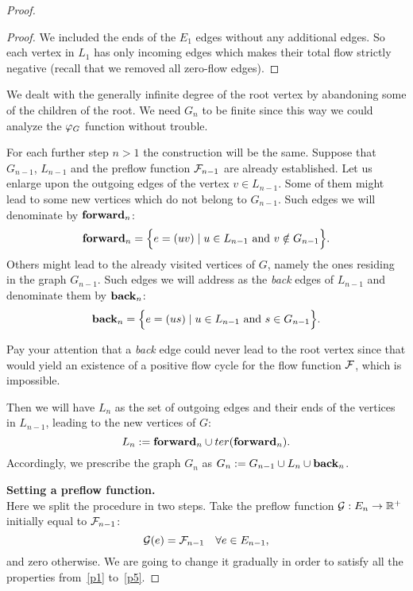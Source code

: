 \documentclass[12pt]{article}
\begin{document}
\begin{proof}
\begin{proof}
        We included the ends of the $E_1$ edges without any additional edges.
        So each vertex in $L_1$ has only incoming edges which makes their total flow strictly negative (recall that we removed all zero-flow edges).
      \end{proof}
      \begin{note}
        We dealt with the generally infinite degree of the root vertex by abandoning some of the children of the root.
        We need $G_n$ to be finite since this way we could analyze the $\gfi$ function without trouble.
      \end{note}
      For each further step $n > 1$ the construction will be the same.
      Suppose that $G_{n-1}$, $L_{n-1}$ and the preflow function $\flowposn{n-1}$ are already established.
      Let us enlarge upon the outgoing edges of the vertex $v \in L_{n-1}$.
      Some of them might lead to some new vertices which do not belong to $G_{n-1}$.
      Such edges we will denominate by $\efor_n$:
      \[
        \efor_n = \Big\{ e = (uv) \mid u \in L_{n-1} \text{ and } v \notin G_{n-1}\Big\}.
      \]
      Others might lead to the already visited vertices of $G$, namely the ones residing in the graph $G_{n-1}$.
      Such edges we will address as the \emph{back} edges of $L_{n-1}$ and denominate them by $\eback_n$:
      \[
        \eback_n = \Big\{e = (us) \mid u \in L_{n-1} \text{ and } s \in G_{n-1}\Big\}.
      \]
      \begin{remark}
        Pay your attention that a \emph{back} edge could never lead to the root vertex since that
          would yield an existence of a positive flow cycle for the flow function $\flowpos$,
          which is impossible.
      \end{remark}
      Then we will have $L_n$ as the set of outgoing edges and their ends of the vertices in $L_{n-1}$, leading to the new vertices of $G$:
      \[
        L_n := \efor_n \cup \ter(\efor_n).
      \]
      Accordingly, we prescribe the graph $G_n$ as $G_n := G_{n-1} \cup L_n \cup \eback_n$.

      \noindent\textbf{Setting a preflow function.}\\
      \noindent Here we split the procedure in two steps.
      Take the preflow function $\cal{G}: E_n \to \mathbb{R}^{+}$ initially equal to $\flowposn{n-1}$:
      \[
        \cal{G}(e) = \flowposn{n-1} \quad \forall e \in E_{n-1},
      \]
      and zero otherwise.
      We are going to change it gradually in order to satisfy all the properties from~\ref{p1} to~\ref{p5}.
      

\end{proof}
\end{document}
